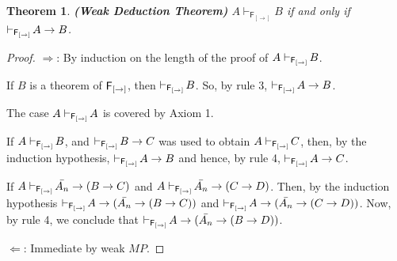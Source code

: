 \documentclass[12pt]{article}
\newtheorem{thm}{Theorem}[section]
\begin{document}
\begin{thm}\label{lli}
\em\textbf{(Weak Deduction Theorem)} $A\vdash_{\mathsf{F_{[\rightarrow]}} }\!B  $ if and only if $\vdash_{{\sf F_{[\rightarrow]}} }\! A\rightarrow B $.
\end{thm}
\begin{proof} $ \Rightarrow $: By induction on the length of the proof of $A\vdash_{{\sf F_{[\rightarrow]}} }\!B  $.

\noindent If $B$ is a theorem of $ {\sf F_{[\rightarrow]}}  $, then $ \vdash_{{\sf F_{[\rightarrow]}} }\!B $. So,
by rule 3, $\vdash_{{\sf F_{[\rightarrow]}} }\!A\rightarrow B  $.

\noindent The case $A\vdash_{{\sf F_{[\rightarrow]}} }\!A  $ is covered by Axiom 1.



\noindent If $ A\vdash_{{\sf F_{[\rightarrow]}} }\!B   $, and $\vdash_{{\sf F_{[\rightarrow]}} }\!B\rightarrow C  $ was used to obtain $ A\vdash_{{\sf F_{[\rightarrow]}} }\!C   $, then, by the induction hypothesis, $\vdash_{{\sf F_{[\rightarrow]}} }\!A\rightarrow B  $ and hence, by rule 4,  $ \vdash_{{\sf F_{[\rightarrow]}} }\!A\rightarrow C $.

\noindent  If $ A\vdash_{{\sf F_{[\rightarrow]}} }\!\bar{A_{n}}\rightarrow (B\rightarrow C)   $ and $ A\vdash_{{\sf F_{[\rightarrow]}} }\!\bar{A_{n}}\rightarrow (C\rightarrow D)   $.  Then, by the induction hypothesis $\vdash_{{\sf F_{[\rightarrow]}} }\!A\rightarrow (\bar{A_{n}}\rightarrow (B\rightarrow C) )  $ and $\vdash_{{\sf F_{[\rightarrow]}} }\!A\rightarrow (\bar{A_{n}}\rightarrow (C\rightarrow D)  ) $.  Now, by  rule 4, we conclude that $\vdash_{{\sf F_{[\rightarrow]}} }\!A\rightarrow (\bar{A_{n}}\rightarrow (B\rightarrow D)  ) $.

\noindent $ \Leftarrow $: Immediate by weak $M\!P$.
\end{proof}
\end{document}
